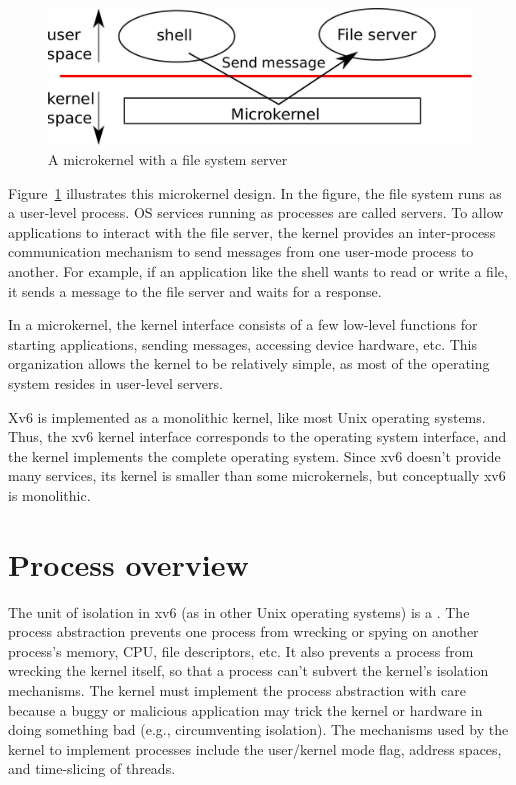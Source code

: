 \begin{figure}[t]
\center
\includegraphics[scale=0.5]{fig/mkernel.pdf}
\caption{A microkernel with a file system server}
\label{fig:mkernel}
\end{figure}

Figure~\ref{fig:mkernel}
illustrates this microkernel design.  In the figure, the file system runs as a
user-level process.  OS services running as processes are called servers.
To allow applications to interact with the
file server, the kernel provides an inter-process communication
mechanism to send messages from one
user-mode process to another.  For example, if an application like the shell
wants to read or write a file, it sends a message to the file server and waits
for a response. 

In a microkernel, the kernel interface consists of a few low-level
functions for starting applications, sending messages,
accessing device hardware, etc.  This organization allows the kernel to be 
relatively simple, as most of the operating system
resides in user-level servers.

Xv6 is
implemented as a monolithic kernel, like most Unix operating systems.
Thus, the xv6 kernel interface corresponds to the operating system
interface, and the kernel implements the complete operating system.  Since 
xv6 doesn't provide many services, its kernel is smaller than some
microkernels, but conceptually xv6 is monolithic.
\section{Process overview}

The unit of isolation in xv6 (as in other Unix operating systems) is a 
.
The process abstraction prevents one process from wrecking or spying on
another process's memory, CPU, file descriptors, etc.  It also prevents a process
from wrecking the kernel itself, so that a process can't subvert the kernel's
isolation mechanisms.
The kernel must implement the process abstraction with care because
a buggy or malicious application may trick the kernel or hardware in doing
something bad (e.g., circumventing isolation).  The mechanisms used by
the kernel to implement processes include the user/kernel mode flag, address spaces,
and time-slicing of threads.

